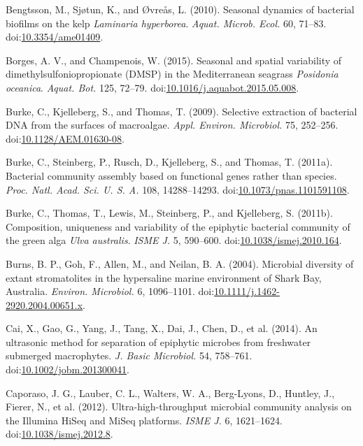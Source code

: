 \documentclass[
  12pt,
]{article}
\begin{document}
\leavevmode\hypertarget{ref-Bengtsson2010}{}%
Bengtsson, M., Sjøtun, K., and Øvreås, L. (2010). Seasonal dynamics of
bacterial biofilms on the kelp \emph{Laminaria hyperborea}. \emph{Aquat.
Microb. Ecol.} 60, 71--83.
doi:\href{https://doi.org/10.3354/ame01409}{10.3354/ame01409}.

\leavevmode\hypertarget{ref-Borges2015}{}%
Borges, A. V., and Champenois, W. (2015). Seasonal and spatial
variability of dimethylsulfoniopropionate (DMSP) in the Mediterranean
seagrass \emph{Posidonia oceanica}. \emph{Aquat. Bot.} 125, 72--79.
doi:\href{https://doi.org/10.1016/j.aquabot.2015.05.008}{10.1016/j.aquabot.2015.05.008}.

\leavevmode\hypertarget{ref-Burke2009}{}%
Burke, C., Kjelleberg, S., and Thomas, T. (2009). Selective extraction
of bacterial DNA from the surfaces of macroalgae. \emph{Appl. Environ.
Microbiol.} 75, 252--256.
doi:\href{https://doi.org/10.1128/AEM.01630-08}{10.1128/AEM.01630-08}.

\leavevmode\hypertarget{ref-Burke2011}{}%
Burke, C., Steinberg, P., Rusch, D., Kjelleberg, S., and Thomas, T.
(2011a). Bacterial community assembly based on functional genes rather
than species. \emph{Proc. Natl. Acad. Sci. U. S. A.} 108, 14288--14293.
doi:\href{https://doi.org/10.1073/pnas.1101591108}{10.1073/pnas.1101591108}.

\leavevmode\hypertarget{ref-Burke2011a}{}%
Burke, C., Thomas, T., Lewis, M., Steinberg, P., and Kjelleberg, S.
(2011b). Composition, uniqueness and variability of the epiphytic
bacterial community of the green alga \emph{Ulva australis}. \emph{ISME
J.} 5, 590--600.
doi:\href{https://doi.org/10.1038/ismej.2010.164}{10.1038/ismej.2010.164}.

\leavevmode\hypertarget{ref-Burns2004}{}%
Burns, B. P., Goh, F., Allen, M., and Neilan, B. A. (2004). Microbial
diversity of extant stromatolites in the hypersaline marine environment
of Shark Bay, Australia. \emph{Environ. Microbiol.} 6, 1096--1101.
doi:\href{https://doi.org/10.1111/j.1462-2920.2004.00651.x}{10.1111/j.1462-2920.2004.00651.x}.

\leavevmode\hypertarget{ref-Cai2014}{}%
Cai, X., Gao, G., Yang, J., Tang, X., Dai, J., Chen, D., et al. (2014).
An ultrasonic method for separation of epiphytic microbes from
freshwater submerged macrophytes. \emph{J. Basic Microbiol.} 54,
758--761.
doi:\href{https://doi.org/10.1002/jobm.201300041}{10.1002/jobm.201300041}.

\leavevmode\hypertarget{ref-Caporaso2012}{}%
Caporaso, J. G., Lauber, C. L., Walters, W. A., Berg-Lyons, D., Huntley,
J., Fierer, N., et al. (2012). Ultra-high-throughput microbial community
analysis on the Illumina HiSeq and MiSeq platforms. \emph{ISME J.} 6,
1621--1624.
doi:\href{https://doi.org/10.1038/ismej.2012.8}{10.1038/ismej.2012.8}.
\end{document}

